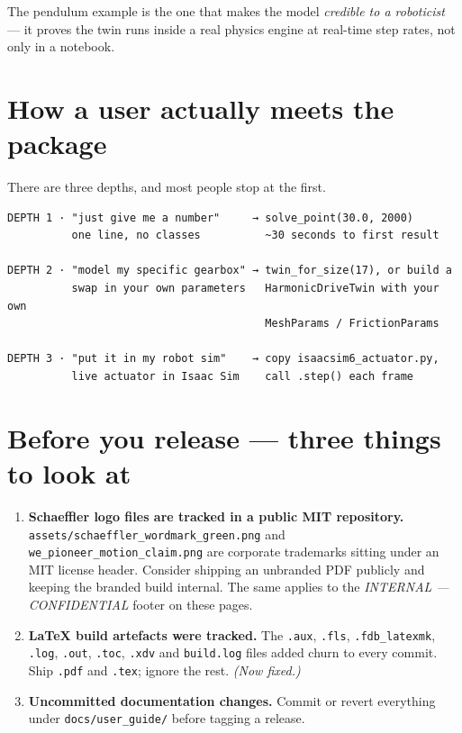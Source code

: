 \documentclass[11pt,a4paper]{article}
\newcommand{\pkg}[1]{\texttt{#1}}
\begin{document}
\vspace{6pt}
\noindent The pendulum example is the one that makes the model \emph{credible
to a roboticist} --- it proves the twin runs inside a real physics engine at
real-time step rates, not only in a notebook.

\section{How a user actually meets the package}

There are three depths, and most people stop at the first.

\begin{Verbatim}[fontsize=\small,xleftmargin=6pt]
DEPTH 1 · "just give me a number"     → solve_point(30.0, 2000)
          one line, no classes          ~30 seconds to first result

DEPTH 2 · "model my specific gearbox" → twin_for_size(17), or build a
          swap in your own parameters   HarmonicDriveTwin with your own
                                        MeshParams / FrictionParams

DEPTH 3 · "put it in my robot sim"    → copy isaacsim6_actuator.py,
          live actuator in Isaac Sim    call .step() each frame
\end{Verbatim}

\section{Before you release --- three things to look at}

\begin{watchout}
\begin{enumerate}
  \item \textbf{Schaeffler logo files are tracked in a public MIT repository.}
        \pkg{assets/schaeffler\_wordmark\_green.png} and
        \pkg{we\_pioneer\_motion\_claim.png} are corporate trademarks sitting
        under an MIT license header. Consider shipping an unbranded PDF
        publicly and keeping the branded build internal. The same applies to
        the \emph{INTERNAL --- CONFIDENTIAL} footer on these pages.
  \item \textbf{LaTeX build artefacts were tracked.} The \pkg{.aux},
        \pkg{.fls}, \pkg{.fdb\_latexmk}, \pkg{.log}, \pkg{.out}, \pkg{.toc},
        \pkg{.xdv} and \pkg{build.log} files added churn to every commit. Ship
        \pkg{.pdf} and \pkg{.tex}; ignore the rest. \emph{(Now fixed.)}
  \item \textbf{Uncommitted documentation changes.} Commit or revert everything
        under \pkg{docs/user\_guide/} before tagging a release.
\end{enumerate}
\end{watchout}
\end{document}
